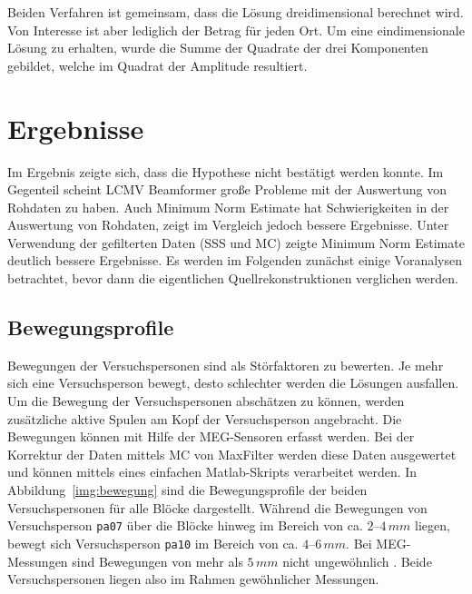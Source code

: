 \documentclass[doc,a4paper,12pt]{apa6}
\begin{document}
Beiden Verfahren ist gemeinsam, dass die Lösung dreidimensional berechnet wird. Von Interesse ist aber lediglich der Betrag für jeden Ort. Um eine eindimensionale Lösung zu erhalten, wurde die Summe der Quadrate der drei Komponenten gebildet, welche im Quadrat der Amplitude resultiert.


\section{Ergebnisse}
\label{sec:ergebnisse}

Im Ergebnis zeigte sich, dass die Hypothese nicht bestätigt werden konnte. Im Gegenteil scheint LCMV Beamformer große Probleme mit der Auswertung von Rohdaten zu haben. Auch Minimum Norm Estimate hat Schwierigkeiten in der Auswertung von Rohdaten, zeigt im Vergleich jedoch bessere Ergebnisse. Unter Verwendung der gefilterten Daten (SSS und MC) zeigte Minimum Norm Estimate deutlich bessere Ergebnisse. Es werden im Folgenden zunächst einige Voranalysen betrachtet, bevor dann die eigentlichen Quellrekonstruktionen verglichen werden.

\subsection{Bewegungsprofile}
\label{sec:bewegung}

Bewegungen der Versuchspersonen sind als Störfaktoren zu bewerten. Je mehr sich eine Versuchsperson bewegt, desto schlechter werden die Lösungen ausfallen. Um die Bewegung der Versuchspersonen abschätzen zu können, werden zusätzliche aktive Spulen am Kopf der Versuchsperson angebracht. Die Bewegungen können mit Hilfe der MEG-Sensoren erfasst werden. Bei der Korrektur der Daten mittels MC von MaxFilter werden diese Daten ausgewertet und können mittels eines einfachen Matlab-Skripts verarbeitet werden. In Abbildung~\ref{img:bewegung} sind die Bewegungsprofile der beiden Versuchspersonen für alle Blöcke dargestellt. Während die Bewegungen von Versuchsperson \texttt{pa07} über die Blöcke hinweg im Bereich von ca. $2$--$4\,mm$ liegen, bewegt sich Versuchsperson \texttt{pa10} im Bereich von ca. $4$--$6\,mm$. Bei MEG-Messungen sind Bewegungen von mehr als $5\,mm$ nicht ungewöhnlich \parencite{wilson2007continuous}. Beide Versuchspersonen liegen also im Rahmen gewöhnlicher Messungen.
\end{document}
